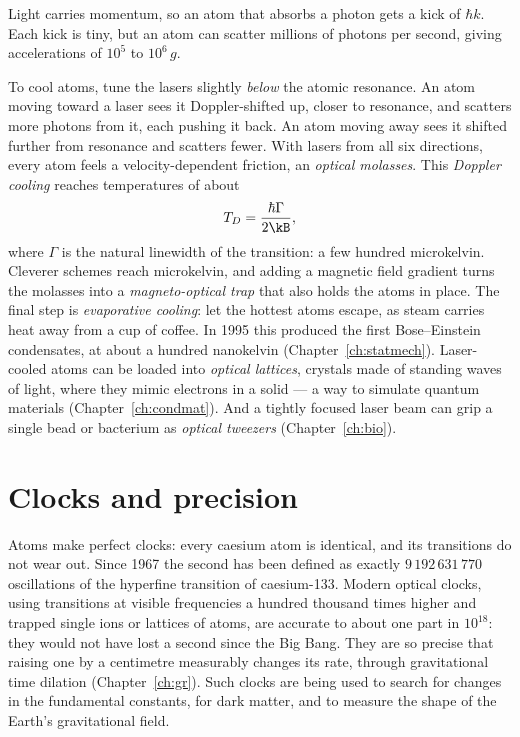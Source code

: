 Light carries momentum, so an atom that absorbs a photon gets a kick of $\hbar k$. Each kick is tiny, but an atom can scatter millions of photons per second, giving accelerations of $10^5$ to $10^6\,g$.

To cool atoms, tune the lasers slightly \emph{below} the atomic resonance. An atom moving toward a laser sees it Doppler-shifted up, closer to resonance, and scatters more photons from it, each pushing it back. An atom moving away sees it shifted further from resonance and scatters fewer. With lasers from all six directions, every atom feels a velocity-dependent friction, an \emph{optical molasses}. This \emph{Doppler cooling} reaches temperatures of about
\[
  T_D = \frac{\hbar\Gamma}{2\kB},
\]
where $\Gamma$ is the natural linewidth of the transition: a few hundred microkelvin. Cleverer schemes reach microkelvin, and adding a magnetic field gradient turns the molasses into a \emph{magneto-optical trap} that also holds the atoms in place. The final step is \emph{evaporative cooling}: let the hottest atoms escape, as steam carries heat away from a cup of coffee. In 1995 this produced the first Bose--Einstein condensates, at about a hundred nanokelvin (Chapter~\ref{ch:statmech}). Laser-cooled atoms can be loaded into \emph{optical lattices}, crystals made of standing waves of light, where they mimic electrons in a solid --- a way to simulate quantum materials (Chapter~\ref{ch:condmat}). And a tightly focused laser beam can grip a single bead or bacterium as \emph{optical tweezers} (Chapter~\ref{ch:bio}).

\section{Clocks and precision}

Atoms make perfect clocks: every caesium atom is identical, and its transitions do not wear out. Since 1967 the second has been defined as exactly $9\,192\,631\,770$ oscillations of the hyperfine transition of caesium-133. Modern optical clocks, using transitions at visible frequencies a hundred thousand times higher and trapped single ions or lattices of atoms, are accurate to about one part in $10^{18}$: they would not have lost a second since the Big Bang. They are so precise that raising one by a centimetre measurably changes its rate, through gravitational time dilation (Chapter~\ref{ch:gr}). Such clocks are being used to search for changes in the fundamental constants, for dark matter, and to measure the shape of the Earth's gravitational field.

